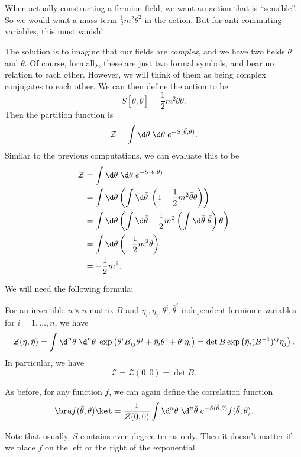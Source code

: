 \documentclass[a4paper]{article}
\begin{document}
When actually constructing a fermion field, we want an action that is ``sensible''. So we would want a mass term $\frac{1}{2} m^2 \theta^2$ in the action. But for anti-commuting variables, this must vanish!

The solution is to imagine that our fields are \emph{complex}, and we have two fields $\theta$ and $\bar{\theta}$. Of course, formally, these are just two formal symbols, and bear no relation to each other. However, we will think of them as being complex conjugates to each other. We can then define the action to be
\[
  S[\bar{\theta}, \theta] = \frac{1}{2} m^2 \bar{\theta} \theta.
\]
Then the partition function is
\[
  \mathcal{Z} = \int \d \theta\; \d \bar{\theta}\; e^{-S(\bar{\theta}, \theta)}.
\]
Similar to the previous computations, we can evaluate this to be
\begin{align*}
  \mathcal{Z} &= \int \d \theta \;\d \bar{\theta}\; e^{-S(\bar{\theta}, \theta)}\\
  &= \int \d \theta \left(\int \d \bar{\theta}\; \left(1 - \frac{1}{2} m^2 \bar{\theta} \theta\right)\right)\\
  &= \int \d \theta \left(\int \d \bar{\theta} - \frac{1}{2} m^2 \left(\int \d \bar{\theta}\; \bar{\theta}\right) \theta \right)\\
  &= \int \d \theta \left(- \frac{1}{2} m^2 \theta\right)\\
  &= -\frac{1}{2} m^2.
\end{align*}

We will need the following formula:
\begin{prop}
  For an invertible $n \times n$ matrix $B$ and $\eta_i, \bar{\eta}_i, \theta^i, \bar{\theta}^i$ independent fermionic variables for $i = 1,\ldots, n$, we have
  \[
    \mathcal{Z}(\eta, \bar{\eta}) = \int \d^n \theta\; \d^n \bar{\theta}\;\exp\left(\bar{\theta}^i B_{ij} \theta^j + \bar{\eta}_i \theta^i + \bar{\theta}^i \eta_i\right) = \det B \exp\left(\bar{\eta}_i (B^{-1})^{ij} \eta_j\right).
  \]
  In particular, we have
  \[
    \mathcal{Z} = \mathcal{Z}(0, 0) = \det B.
  \]
\end{prop}
As before, for any function $f$, we can again define the correlation function
\[
  \bra f(\bar{\theta}, \theta)\ket = \frac{1}{\mathcal{Z}(0, 0)} \int \d^n \theta\; \d^n \bar{\theta}\; e^{-S(\bar{\theta}, \theta)} f(\bar{\theta}, \theta).
\]

Note that usually, $S$ contains even-degree terms only. Then it doesn't matter if we place $f$ on the left or the right of the exponential.
\end{document}
